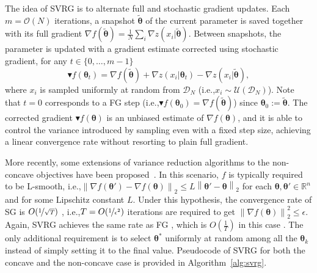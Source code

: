 \documentclass{article}
\makeatletter
\theoremstyle{remark}
\theoremstyle{definition}
\DeclareRobustCommand{\eg}{e.g.,\@\xspace}
\DeclareRobustCommand{\ie}{i.e.,\@\xspace}
\newcommand{\realspace}{\mathbb R}      %
\newcommand{\norm}[2][\infty]{\left\|#2\right\|_{#1}}
\newcommand{\vtheta}{\boldsymbol{\theta}}
\newcommand{\wt}[1]{\widetilde{#1}}
\makeatother
\begin{document}
The idea of SVRG is to alternate full and stochastic gradient updates. 
Each $m = \mathcal{O}(N)$ iterations, a snapshot $\widetilde{\vtheta}$ of the current parameter is saved together with its full gradient $\nabla f(\widetilde{\vtheta}) = \frac{1}{N} \sum_i \nabla z(x_i|\widetilde{\vtheta})$.
Between snapshots, the parameter is updated with a gradient estimate corrected using stochastic gradient, for any $t \in \{0,\ldots,m-1\}$
\begin{equation}\label{E:svrg.gradient.correction}
        \blacktriangledown f(\vtheta_{t}) = \nabla f(\tilde{\vtheta}) + \nabla z(x_i | \vtheta_t) - \nabla z(x_i | \tilde{\vtheta}),
\end{equation} 
where $x_i$ is sampled uniformly at random from $\mathcal{D}_N$ (\ie $x_i \sim \mathcal{U}(\mathcal{D}_N)$).
Note that $t=0$ corresponds to a FG step (\ie $\blacktriangledown f(\vtheta_0) = \nabla f(\wt{\vtheta})$) since $\vtheta_0 := \wt{\vtheta}$.
The corrected gradient $\blacktriangledown f(\vtheta)$ is an unbiased estimate of $\nabla f(\vtheta)$, and it is able to control the variance introduced by sampling even with a fixed step size, achieving a linear convergence rate without resorting to plain full gradient.

More recently, some extensions of variance reduction algorithms to the non-concave objectives have been proposed~\citep[\eg][]{reddi2016stochastic,allen2016variance,reddi2016stochastic,reddi2016fast}. In this scenario, $f$ is typically required to be L-smooth, \ie $\norm[2]{\nabla f(\vtheta') - \nabla f(\vtheta)} \leq L\norm[2]{\vtheta'-\vtheta}$ for each $\vtheta,\vtheta'\in\realspace^n$ and for some Lipschitz constant $L$. Under this hypothesis, the convergence rate of SG is $O(\nicefrac{1}{\sqrt{T}})$ \cite{ghadimi2013stochastic}, \ie $T=O(\nicefrac{1}{\epsilon^2})$ iterations are required to get $\norm[2]{\nabla f(\vtheta)}^2\leq\epsilon$. Again, SVRG achieves the same rate as FG \cite{reddi2016stochastic}, which is $O(\frac{1}{T})$ in this case \cite{nesterov2013introductory}. The only additional requirement is to select $\vtheta^*$ uniformly at random among all the $\vtheta_k$ instead of simply setting it to the final value. Pseudocode of SVRG for both the concave and the non-concave case is provided in Algorithm~\ref{alg:svrg}.
\end{document}
